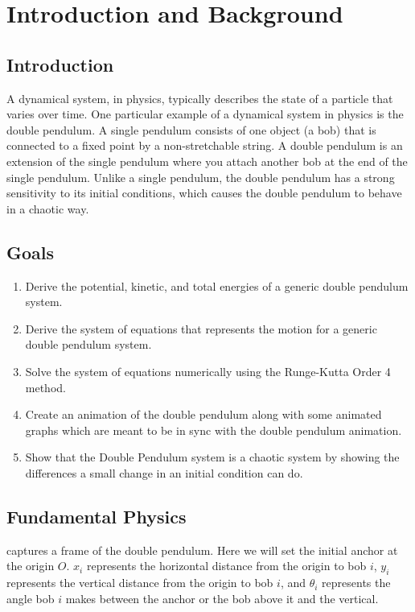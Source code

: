 \section{Introduction and Background}\label{sec:introduction-and-background}

\subsection{Introduction}\label{subsec:introduction}
A dynamical system, in physics, typically describes the state of a particle that varies over time. One particular example of a dynamical system in physics is the double pendulum. A single pendulum consists of one object (a bob) that is connected to a fixed point by a non-stretchable string. A double pendulum is an extension of the single pendulum where you attach another bob at the end of the single pendulum. Unlike a single pendulum, the double pendulum has a strong sensitivity to its initial conditions, which causes the double pendulum to behave in a chaotic way.

\subsection{Goals}\label{subsec:goals}
\begin{enumerate}
    \item Derive the potential, kinetic, and total energies of a generic double pendulum system.
    \item Derive the system of equations that represents the motion for a generic double pendulum system.
    \item Solve the system of equations numerically using the Runge-Kutta Order 4 method.
    \item Create an animation of the double pendulum along with some animated graphs which are meant to be in sync with the double pendulum animation.
    \item Show that the Double Pendulum system is a chaotic system by showing the differences a small change in an initial condition can do.
\end{enumerate}

\subsection{Fundamental Physics}\label{subsec:fundamental-physics}
 captures a frame of the double pendulum. Here we will set the initial anchor at the origin $O$. $x_i$ represents the horizontal distance from the origin to bob $i$, $y_i$ represents the vertical distance from the origin to bob $i$, and $\theta_i$ represents the angle bob $i$ makes between the anchor or the bob above it and the vertical. \\

